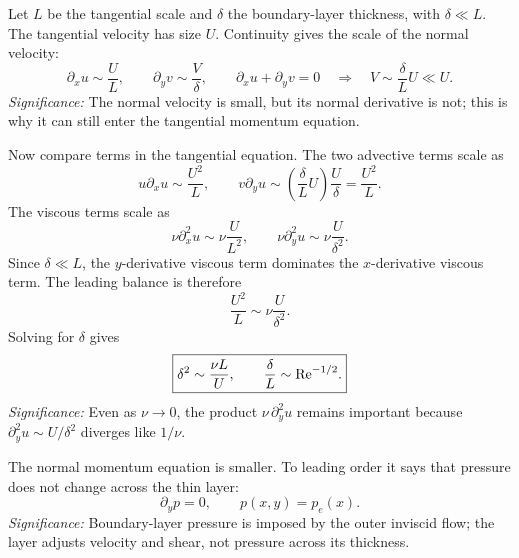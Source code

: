 \documentclass[../main.tex]{subfiles}
\begin{document}
Let $L$ be the tangential scale and $\delta$ the boundary-layer thickness, with
$\delta\ll L$.  The tangential velocity has size $U$.  Continuity gives the
scale of the normal velocity:
\begin{equation}
  \partial_xu\sim\frac{U}{L},\qquad
  \partial_yv\sim\frac{V}{\delta},
  \qquad
  \partial_xu+\partial_yv=0
  \quad\Rightarrow\quad
  \boxed{V\sim\frac{\delta}{L}U\ll U.}
  \label{eq:lec24_normal_velocity_scaling}
\end{equation}
\textit{Significance:} The normal velocity is small, but its normal derivative
is not; this is why it can still enter the tangential momentum equation.

Now compare terms in the tangential equation.  The two advective terms scale as
\begin{equation}
  u\partial_xu\sim\frac{U^2}{L},\qquad
  v\partial_yu\sim
  \left(\frac{\delta}{L}U\right)\frac{U}{\delta}
  =\frac{U^2}{L}.
  \label{eq:lec24_advection_scaling}
\end{equation}
The viscous terms scale as
\begin{equation}
  \nu\partial_x^2u\sim\nu\frac{U}{L^2},\qquad
  \nu\partial_y^2u\sim\nu\frac{U}{\delta^2}.
  \label{eq:lec24_viscous_scaling}
\end{equation}
Since $\delta\ll L$, the $y$-derivative viscous term dominates the $x$-derivative
viscous term.  The leading balance is therefore
\begin{equation}
  \frac{U^2}{L}\sim\nu\frac{U}{\delta^2}.
  \label{eq:lec24_thickness_balance_raw}
\end{equation}
Solving for $\delta$ gives
\begin{equation}
  \boxed{\delta^2\sim\frac{\nu L}{U},\qquad
  \frac{\delta}{L}\sim\mathrm{Re}^{-1/2}.}
  \label{eq:lec24_boundary_layer_thickness_general}
\end{equation}
\textit{Significance:} Even as $\nu\to0$, the product
$\nu\,\partial_y^2u$ remains important because
$\partial_y^2u\sim U/\delta^2$ diverges like $1/\nu$.

The normal momentum equation is smaller.  To leading order it says that
pressure does not change across the thin layer:
\begin{equation}
  \boxed{\partial_y p=0,\qquad p(x,y)=p_e(x).}
  \label{eq:lec24_pressure_constant_across_layer}
\end{equation}
\textit{Significance:} Boundary-layer pressure is imposed by the outer inviscid
flow; the layer adjusts velocity and shear, not pressure across its thickness.
\end{document}
